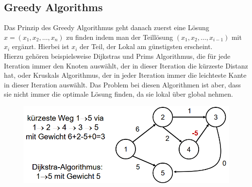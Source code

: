 \documentclass[
../../AuD-Zusammenfassung.tex,
]
{subfiles}
\begin{document}
\subsection{Greedy Algorithms}
Das Prinzip des Greedy Algorithmus geht danach zuerst eine Lösung $x = (x_1,x_2,\ldots,x_n)$ zu finden indem man der Teillösung $(x_1,x_2,\ldots,x_{i-1})$ mit $x_i$ ergänzt. Hierbei ist $x_i$ der Teil, der Lokal am günstigsten erscheint.\\
Hierzu gehören beispielsweise Dijkstras und Prims Algorithmus, die für jede Iteration immer den Knoten auswählt, der in dieser Iteration die kürzeste Distanz hat, oder Kruskals Algorithmus, der in jeder Iteration immer die leichteste Kante in dieser Iteration auswählt. Das Problem bei diesen Algorithmen ist aber, dass sie nicht immer die optimale Lösung finden, da sie lokal über global nehmen. 
\begin{figure}[htp]
    \centering
    \includegraphics[scale = 0.6]{Pics/DijkstraWrong.png}
\end{figure}
\end{document}
